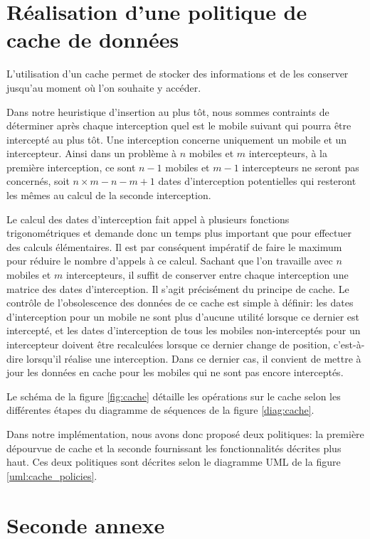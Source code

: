 \chapter{Réalisation d'une politique de cache de données}
\label{app:cache}
	L'utilisation d'un \gls{cache} permet de stocker des informations et de les conserver jusqu'au moment où l'on souhaite y accéder.

	Dans notre heuristique d'insertion au plus tôt, nous sommes contraints de déterminer après chaque interception quel est le mobile suivant qui pourra être intercepté au plus tôt. Une interception concerne uniquement un mobile et un intercepteur. Ainsi dans un problème à $n$ mobiles et $m$ intercepteurs, à la première interception, ce sont $n-1$ mobiles et $m-1$ intercepteurs ne seront pas concernés, soit $n \times m -n -m +1$ dates d'interception potentielles qui resteront les mêmes au calcul de la seconde interception.

	Le calcul des dates d'interception fait appel à plusieurs fonctions trigonométriques et demande donc un temps plus important que pour effectuer des calculs élémentaires. Il est par conséquent impératif de faire le maximum pour réduire le nombre d'appels à ce calcul. Sachant que l'on travaille avec $n$ mobiles et $m$ intercepteurs, il suffit de conserver entre chaque interception une matrice des dates d'interception. Il s'agit précisément du principe de cache. Le contrôle de l'obsolescence des données de ce cache est simple à définir: les dates d'interception pour un mobile ne sont plus d'aucune utilité lorsque ce dernier est intercepté, et les dates d'interception de tous les mobiles non-interceptés pour un intercepteur doivent être recalculées lorsque ce dernier change de position, c'est-à-dire lorsqu'il réalise une interception. Dans ce dernier cas, il convient de mettre à jour les données en cache pour les mobiles qui ne sont pas encore interceptés.

	Le schéma de la figure \ref{fig:cache} détaille les opérations sur le cache selon les différentes étapes du diagramme de séquences de la figure \ref{diag:cache}.


	Dans notre implémentation, nous avons donc proposé deux politiques: la première dépourvue de cache et la seconde fournissant les fonctionnalités décrites plus haut. Ces deux politiques sont décrites selon le diagramme UML de la figure \ref{uml:cache_policies}.

\chapter{Seconde annexe}
